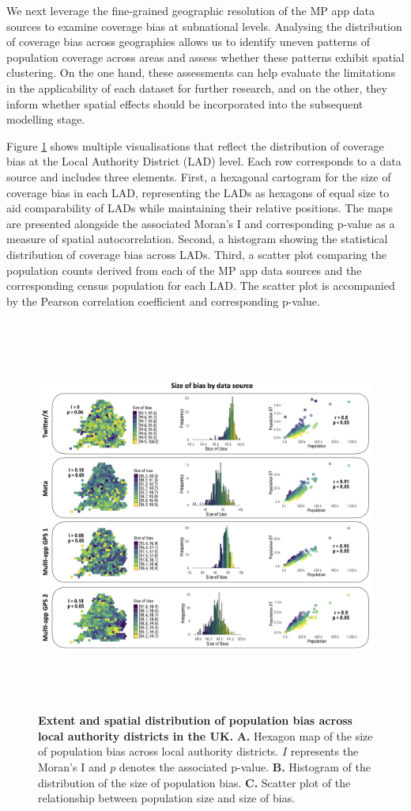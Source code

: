 \documentclass[]{rsos}%
\begin{document}
We next leverage the fine-grained geographic resolution of the MP app
data sources to examine coverage bias at subnational levels. Analysing
the distribution of coverage bias across geographies allows us to
identify uneven patterns of population coverage across areas and assess
whether these patterns exhibit spatial clustering. On the one hand,
these assessments can help evaluate the limitations in the applicability
of each dataset for further research, and on the other, they inform
whether spatial effects should be incorporated into the subsequent
modelling stage.

Figure \ref{fig:bias-size} shows multiple visualisations that
reflect the distribution of coverage bias at the Local Authority
District (LAD) level. Each row corresponds to a data source and includes
three elements. First, a hexagonal cartogram for the size of coverage
bias in each LAD, representing the LADs as hexagons of equal size to aid
comparability of LADs while maintaining their relative positions. The
maps are presented alongside the associated Moran's I and corresponding
p-value as a measure of spatial autocorrelation. Second, a histogram
showing the statistical distribution of coverage bias across LADs.
Third, a scatter plot comparing the population counts derived from each
of the MP app data sources and the corresponding census population for
each LAD. The scatter plot is accompanied by the Pearson correlation
coefficient and corresponding p-value.

\begin{figure}
\centering
\includegraphics[width=14cm,height=13cm]{figures/Fig-size-bias.png}
\caption{\textbf{Extent and spatial distribution of population bias across local authority districts in the UK.} \textbf{A.} Hexagon map of the size of population bias across local authority districts. \(I\) represents the Moran's I and \(p\) denotes the associated p-value. \textbf{B.} Histogram of the distribution of the size of population bias. \textbf{C.} Scatter plot of the relationship between population size and size of bias.}\label{fig:bias-size}
\end{figure}
\end{document}

